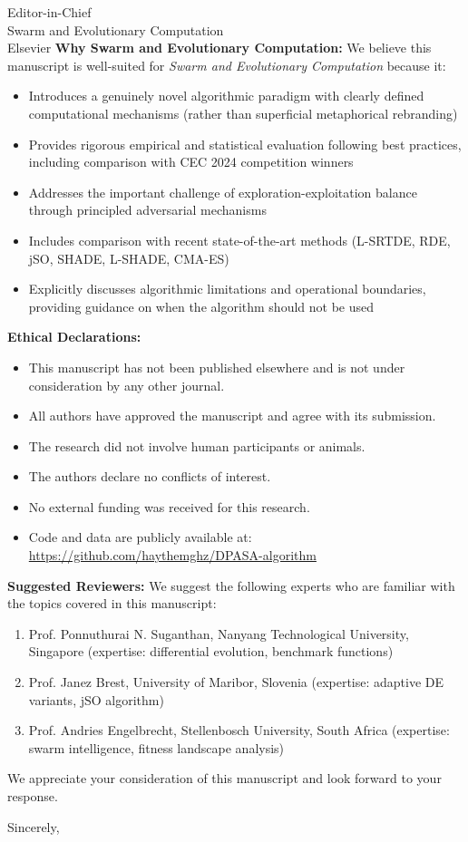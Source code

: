 \documentclass[11pt]{letter}
\begin{document}
\begin{letter}{Editor-in-Chief\\
Swarm and Evolutionary Computation\\
Elsevier}
\textbf{Why Swarm and Evolutionary Computation:}
We believe this manuscript is well-suited for \textit{Swarm and Evolutionary Computation} because it:
\begin{itemize}
    \item Introduces a genuinely novel algorithmic paradigm with clearly defined computational mechanisms (rather than superficial metaphorical rebranding)
    \item Provides rigorous empirical and statistical evaluation following best practices, including comparison with CEC 2024 competition winners
    \item Addresses the important challenge of exploration-exploitation balance through principled adversarial mechanisms
    \item Includes comparison with recent state-of-the-art methods (L-SRTDE, RDE, jSO, SHADE, L-SHADE, CMA-ES)
    \item Explicitly discusses algorithmic limitations and operational boundaries, providing guidance on when the algorithm should not be used
\end{itemize}

\textbf{Ethical Declarations:}
\begin{itemize}
    \item This manuscript has not been published elsewhere and is not under consideration by any other journal.
    \item All authors have approved the manuscript and agree with its submission.
    \item The research did not involve human participants or animals.
    \item The authors declare no conflicts of interest.
    \item No external funding was received for this research.
    \item Code and data are publicly available at: \url{https://github.com/haythemghz/DPASA-algorithm}
\end{itemize}

\textbf{Suggested Reviewers:}
We suggest the following experts who are familiar with the topics covered in this manuscript:
\begin{enumerate}
    \item Prof. Ponnuthurai N. Suganthan, Nanyang Technological University, Singapore (expertise: differential evolution, benchmark functions)
    \item Prof. Janez Brest, University of Maribor, Slovenia (expertise: adaptive DE variants, jSO algorithm)
    \item Prof. Andries Engelbrecht, Stellenbosch University, South Africa (expertise: swarm intelligence, fitness landscape analysis)
\end{enumerate}

We appreciate your consideration of this manuscript and look forward to your response.

\closing{Sincerely,}

\end{letter}
\end{document}
